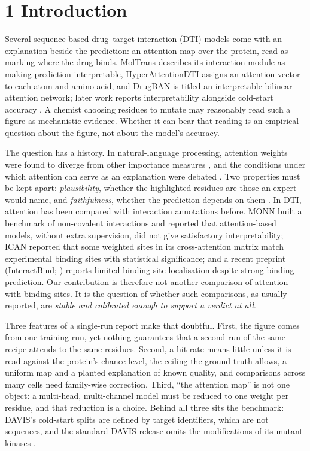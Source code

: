 \section{1 Introduction}\label{introduction}

Several sequence-based drug--target interaction (DTI) models come with an explanation beside the prediction: an attention map over the protein, read as marking where the drug binds. MolTrans \citep{Huang2021} describes its interaction module as making prediction interpretable, HyperAttentionDTI \citep{Zhao2022} assigns an attention vector to each atom and amino acid, and DrugBAN \citep{Bai2023} is titled an interpretable bilinear attention network; later work reports interpretability alongside cold-start accuracy \citep[for example GPS-DTI;][]{Xiong2025}. A chemist choosing residues to mutate may reasonably read such a figure as mechanistic evidence. Whether it can bear that reading is an empirical question about the figure, not about the model's accuracy.

The question has a history. In natural-language processing, attention weights were found to diverge from other importance measures \citep{Jain2019,Serrano2019}, and the conditions under which attention can serve as an explanation were debated \citep{Wiegreffe2019}. Two properties must be kept apart: \emph{plausibility}, whether the highlighted residues are those an expert would name, and \emph{faithfulness}, whether the prediction depends on them \citep{DeYoung2020}. In DTI, attention has been compared with interaction annotations before. MONN \citep{Li2020} built a benchmark of non-covalent interactions and reported that attention-based models, without extra supervision, did not give satisfactory interpretability; ICAN \citep{Kurata2022} reported that some weighted sites in its cross-attention matrix match experimental binding sites with statistical significance; and a recent preprint (InteractBind; \citealp{Meng2026}) reports limited binding-site localisation despite strong binding prediction. Our contribution is therefore not another comparison of attention with binding sites. It is the question of whether such comparisons, as usually reported, are \emph{stable and calibrated enough to support a verdict at all}.

Three features of a single-run report make that doubtful. First, the figure comes from one training run, yet nothing guarantees that a second run of the same recipe attends to the same residues. Second, a hit rate means little unless it is read against the protein's chance level, the ceiling the ground truth allows, a uniform map and a planted explanation of known quality, and comparisons across many cells need family-wise correction. Third, ``the attention map'' is not one object: a multi-head, multi-channel model must be reduced to one weight per residue, and that reduction is a choice. Behind all three sits the benchmark: DAVIS's cold-start splits are defined by target identifiers, which are not sequences, and the standard DAVIS release omits the modifications of its mutant kinases \citep[][preprint]{Wu2025}.

